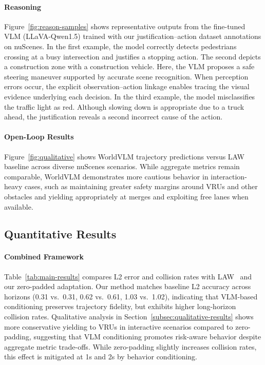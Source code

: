 \documentclass[letterpaper, 10 pt, conference]{ieeeconf}
\begin{document}
\paragraph{Reasoning}


Figure~\ref{fig:reason-samples} shows representative outputs from the fine-tuned VLM (LLaVA-Qwen1.5) trained with our justification–action dataset annotations on nuScenes.
In the first example, the model correctly detects pedestrians crossing at a busy intersection and justifies a stopping action. The second depicts a construction zone with a construction vehicle. Here, the VLM proposes a safe steering maneuver supported by accurate scene recognition.
When perception errors occur, the explicit observation–action linkage enables tracing the visual evidence underlying each decision. In the third example, the model misclassifies the traffic light as red. Although slowing down is appropriate due to a truck ahead, the justification reveals a second incorrect cause of the action.

\paragraph{Open-Loop Results}
Figure~\ref{fig:qualitative} shows WorldVLM trajectory predictions versus LAW baseline across diverse nuScenes scenarios. While aggregate metrics remain comparable, WorldVLM demonstrates more cautious behavior in interaction-heavy cases, such as maintaining greater safety margins around VRUs and other obstacles and yielding appropriately at merges and exploiting free lanes when available.

\subsection{Quantitative Results}
\paragraph{Combined Framework}
Table~\ref{tab:main-results} compares L2 error and collision rates with LAW~\cite{li2025enhancing} and our zero-padded adaptation. Our method matches baseline L2 accuracy across horizons (0.31 vs.\ 0.31, 0.62 vs.\ 0.61, 1.03 vs.\ 1.02), indicating that VLM-based conditioning preserves trajectory fidelity, but exhibits higher long-horizon collision rates. Qualitative analysis in Section~\ref{subsec:qualitative-results} shows more conservative yielding to VRUs in interactive scenarios compared to zero-padding, suggesting that VLM conditioning promotes risk-aware behavior despite aggregate metric trade-offs. While zero-padding slightly increases collision rates, this effect is mitigated at 1s and 2s by behavior conditioning.
\end{document}
